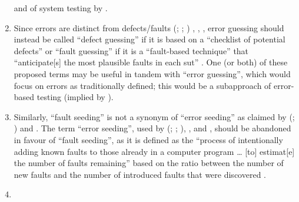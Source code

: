 \begin{enumerate}
          and of system testing by \citet[p.~23]{Firesmith2015}.
    \item %
          Since errors are distinct from defects/faults \ifnotpaper
              (\citealp[pp.~128, 140]{IEEE2010}; \citealp[p.~12\=/3]{SWEBOK2024};
              \citealp[pp.~399--400]{vanVliet2000})\else
              \cite[p.~12\=/3]{SWEBOK2024}, \cite[pp.~128, 140]{IEEE2010},
              \cite[pp.~399--400]{vanVliet2000}\fi, error guessing should
          instead be called ``defect guessing'' if it is based on a ``checklist
          of potential defects'' \citep[p.~29]{IEEE2021} or ``fault guessing''
          if it is a ``fault-based technique'' \citep[p.~4\=/9]{SWEBOK2014}
          that ``anticipate[s] the most plausible faults in each \acs{sut}''
          \citep[p.~5\=/13]{SWEBOK2024}. One (or both) of these proposed terms
          may be useful in tandem with ``error guessing'', which would focus on
          errors as traditionally defined; this would be a subapproach of
          error-based testing (implied by \citealp[p.~399]{vanVliet2000}).
    \item %
          Similarly, ``fault seeding'' is not a synonym of ``error seeding''
          as claimed by \ifnotpaper (\citealp[p.~165]{IEEE2017};
              \citealp[p.~427]{vanVliet2000})\else \cite[p.~165]{IEEE2017} and
              \cite[p.~427]{vanVliet2000}\fi. The term ``error seeding'', used
          by \ifnotpaper (\citealp[p.~165]{IEEE2017}; \citealp[p.~34]{Firesmith2015};
              \citealp[p.~427]{vanVliet2000})\else \citealp[p.~34]{Firesmith2015},
              \citealp[p.~165]{IEEE2017}, and \citealp[p.~427]{vanVliet2000}\fi,
          should be abandoned in favour of ``fault seeding'', as it is defined
          as the ``process of intentionally adding known faults to those
          already in a computer program \dots{} [to] estimat[e] the number of
          faults remaining'' \citep[p.~165]{IEEE2017} based on the ratio
          between the number of new faults and the number of introduced faults
          that were discovered \citep[p.~427]{vanVliet2000}.
    \item %

\end{enumerate}
